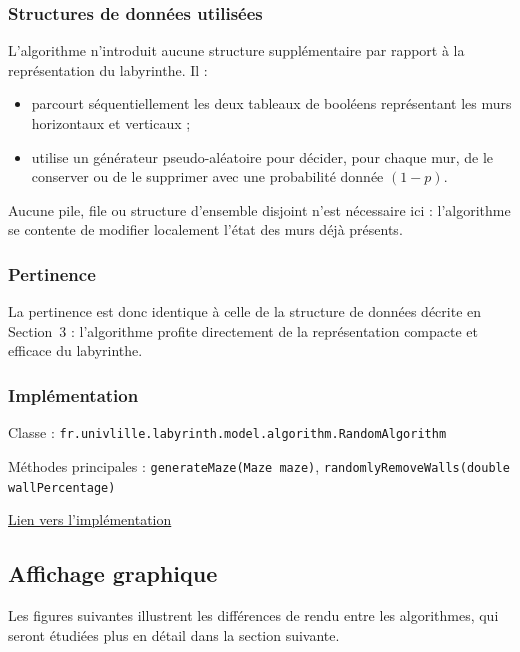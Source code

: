 \documentclass{butexFR}
\begin{document}
\subsubsection{Structures de données utilisées}

L'algorithme n'introduit aucune structure supplémentaire par rapport à la représentation du labyrinthe. Il :

\begin{itemize}
    \item parcourt séquentiellement les deux tableaux de booléens représentant les murs horizontaux et verticaux ;
    \item utilise un générateur pseudo-aléatoire pour décider, pour chaque mur, de le conserver ou de le supprimer avec une probabilité donnée $(1 - p)$.
\end{itemize}

Aucune pile, file ou structure d'ensemble disjoint n'est nécessaire ici : l'algorithme se contente de modifier localement l'état des murs déjà présents.

\subsubsection{Pertinence}

La pertinence est donc identique à celle de la structure de données décrite en Section~3 : l'algorithme profite directement de la représentation compacte et efficace du labyrinthe.

\subsubsection{Implémentation}

Classe : \texttt{fr.univlille.labyrinth.model.algorithm.RandomAlgorithm}

Méthodes principales : \texttt{generateMaze(Maze maze)}, \texttt{randomlyRemoveWalls(double wallPercentage)}

\href{https://gitlab.univ-lille.fr/sae302/2025/G2_SAE3.3/-/blob/master/labyrinth/src/main/java/fr/univlille/labyrinth/model/algorithm/RandomAlgorithm.java?ref_type=heads}{Lien vers l'implémentation}

\newpage

\subsection{Affichage graphique}

Les figures suivantes illustrent les différences de rendu entre les algorithmes, qui seront étudiées plus en détail dans la section suivante.
\end{document}

